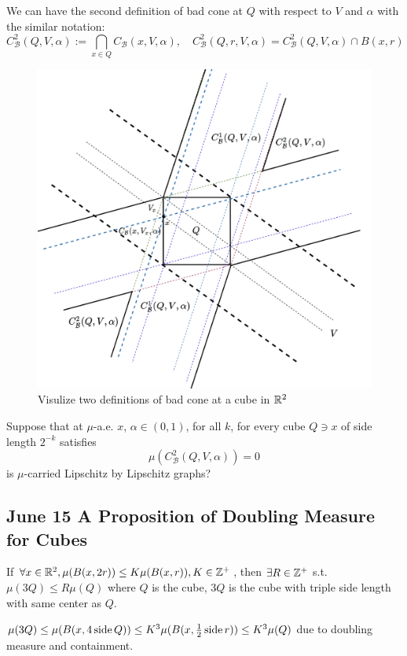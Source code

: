 \begin{definition}
    We can have the second definition of bad cone at $Q$ with respect to $V$ and $\alpha$ with the similar notation:
    $$C^2_{\mathcal{B}}(Q, V, \alpha) := \bigcap_{x\in Q} C_\mathcal{B}(x, V, \alpha), \quad
    C^2_{\mathcal{B}}(Q, r, V, \alpha) = C^2_{\mathcal{B}}(Q, V, \alpha) \cap B(x,r)
    $$
\end{definition}
\begin{figure}[H]
    \centering
    \includegraphics[width=.66\textwidth]{images/cubebadconeDef.png}
    \caption{Visulize two definitions of bad cone at a cube in $\mathbb{R}^2$}
\end{figure}

\begin{problem}
    Suppose that at $\mu$-a.e. $x$, $\alpha\in(0, 1)$, for all $k$, for every cube $Q\ni x$ of side length $2^{-k}$ satisfies
    $$
    \mu(C^2_\mathcal{B}(Q, V, \alpha)) = 0
    $$ 
    is $\mu$-carried Lipschitz by Lipschitz graphs?
\end{problem}

\newpage
\subsection{June 15 A Proposition of Doubling Measure for Cubes}

\begin{proposition}
    If $\forall x\in \mathbb{R}^2, \mu(B(x, 2r))\leq K\mu(B(x,r)), K\in\mathbb{Z}^+$, then $\exists R\in \mathbb{Z}^+$ s.t. $\mu(3Q)\leq R\mu(Q)$ where $Q$ is the cube, 3$Q$ is the cube with triple side length with same center as $Q$. 
\end{proposition}
\proof  $\mu(3Q) \leq \mu(B(x, 4\operatorname{side} Q)) \leq K^3\mu(B(x, \frac{1}{2} \operatorname{side} r))\leq K^3 \mu(Q)$ due to doubling measure and containment. 

